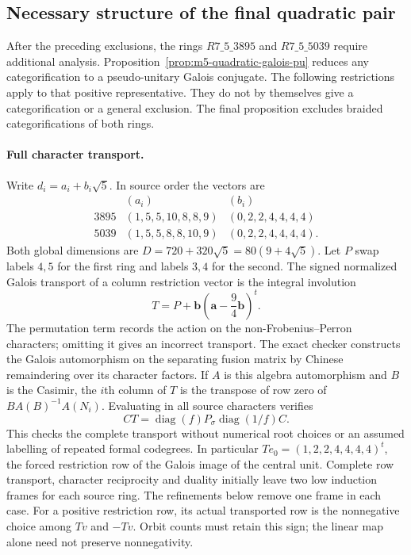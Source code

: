 \subsection{Necessary structure of the final quadratic pair}
\label{sec:m5-remaining-quadratic}
After the preceding exclusions, the rings $R7\_5\_3895$ and
$R7\_5\_5039$ require additional analysis.
Proposition~\ref{prop:m5-quadratic-galois-pu} reduces
any categorification to a pseudo-unitary Galois conjugate.  The following
restrictions apply to that positive representative.  They do not by
themselves give a categorification or a general exclusion.  The final
proposition excludes braided categorifications of both rings.

\paragraph{Full character transport.}
Write $d_i=a_i+b_i\sqrt5$.  In source order the vectors are
\[
\begin{array}{c|l|l}
 & (a_i) & (b_i)\\\hline
3895&(1,5,5,10,8,8,9)&(0,2,2,4,4,4,4)\\
5039&(1,5,5,8,8,10,9)&(0,2,2,4,4,4,4).
\end{array}
\]
Both global dimensions are
$D=720+320\sqrt5=80(9+4\sqrt5)$.
Let $P$ swap labels $4,5$ for the first ring and labels $3,4$ for
the second.  The signed normalized Galois transport of a column restriction
vector is the integral involution
\begin{equation}\label{eq:m5-q5-transport}
 T=P+\mathbf b\left(\mathbf a-\frac94\mathbf b\right)^{\!t}.
\end{equation}
The permutation term records the action on the non-Frobenius--Perron
characters; omitting it gives an incorrect transport.  The exact checker
constructs the Galois automorphism on the separating fusion matrix by
Chinese remaindering over its character factors.  If $A$ is this algebra
automorphism and $B$ is the Casimir, the $i$th column of $T$ is the
transpose of row zero of $B A(B)^{-1}A(N_i)$.  Evaluating in all source
characters verifies
\[
 CT=\operatorname{diag}(f)P_\sigma\operatorname{diag}(1/f)C.
\]
This checks the complete transport without numerical root choices or
an assumed labelling of repeated formal codegrees.  In particular
$Te_0=(1,2,2,4,4,4,4)^t$, the forced restriction row of the Galois
image of the central unit.  Complete row transport, character reciprocity
and duality initially leave two low induction frames for each source ring.
The refinements below remove one frame in each case.
For a positive restriction row, its actual transported row is the
nonnegative choice among $Tv$ and $-Tv$.  Orbit counts must retain
this sign; the linear map alone need not preserve nonnegativity.

